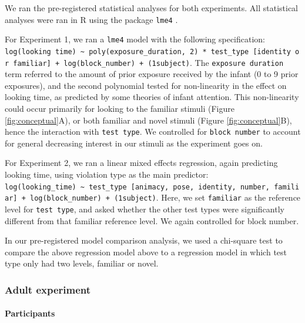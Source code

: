 \documentclass[
]{article}
\begin{document}
We ran the pre-registered statistical analyses for both experiments. All statistical analyses were ran in R using the package \texttt{lme4} \autocite{bates2015package}.

For Experiment 1, we ran a \texttt{lme4} model with the following specification: \texttt{log(looking\ time)\ \textasciitilde{}\ poly(exposure\_duration,\ 2)\ *\ test\_type\ {[}identity\ or\ familiar{]}\ +\ log(block\_number)\ +\ (1\textbar{}subject)}. The \texttt{exposure\ duration} term referred to the amount of prior exposure received by the infant (0 to 9 prior exposures), and the second polynomial tested for non-linearity in the effect on looking time, as predicted by some theories of infant attention. This non-linearity could occur primarily for looking to the familiar stimuli (Figure \ref{fig:conceptual}A), or both familiar and novel stimuli (Figure \ref{fig:conceptual}B), hence the interaction with \texttt{test\ type}. We controlled for \texttt{block\ number} to account for general decreasing interest in our stimuli as the experiment goes on.

For Experiment 2, we ran a linear mixed effects regression, again predicting looking time, using violation type as the main predictor: \texttt{log(looking\_time)\ \textasciitilde{}\ test\_type\ {[}animacy,\ pose,\ identity,\ number,\ familiar{]}\ +\ log(block\_number)\ +\ (1\textbar{}subject)}. Here, we set \texttt{familiar} as the reference level for \texttt{test\ type}, and asked whether the other test types were significantly different from that familiar reference level. We again controlled for block number.

In our pre-registered model comparison analysis, we used a chi-square test to compare the above regression model above to a regression model in which test type only had two levels, familiar or novel.

\hypertarget{adult-experiment-2}{%
\subsubsection{Adult experiment}\label{adult-experiment-2}}

\hypertarget{participants-1}{%
\paragraph{Participants}\label{participants-1}}
\end{document}

